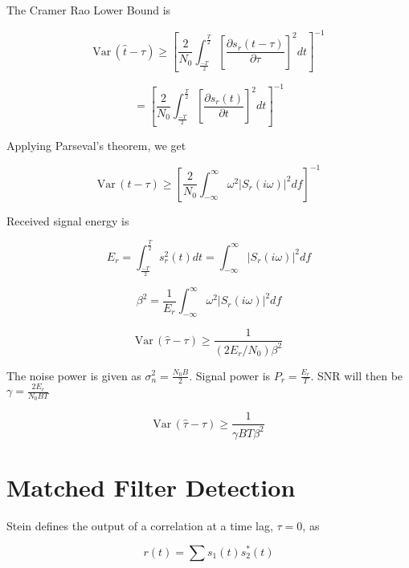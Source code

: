 \documentclass[11pt]{article}
\def\Var{{\textrm{Var}}\,}
\begin{document}
The Cramer Rao Lower Bound is

\begin{equation}
\Var(\hat{t} - \tau)
\geq
\left[
\frac{2}{N_0}
\int^\frac{T}{2}_\frac{-T}{2} \left[ \frac{\partial s_r(t-\tau)}{\partial \tau} \right]^2 dt \right]^{-1}
\end{equation}


\begin{equation}
= \left[ \frac{2}{N_0} \int^\frac{T}{2}_\frac{-T}{2} \left[ \frac{\partial s_r(t)}{\partial t} \right]^2 dt \right]^{-1}
\end{equation}

Applying Parseval's theorem, we get

\begin{equation}
\Var(t-\tau)
\geq
\left[ \frac{2}{N_0} \int^{\infty}_{-\infty} \omega^2 |S_r(i\omega )|^2 df \right]^{-1}
\end{equation}

Received signal energy is

\begin{equation}
E_r = \int^\frac{T}{2}_\frac{-T}{2} s_r^2(t)dt = \int^\infty_{-\infty} |S_r(i\omega)|^2 df
\end{equation}

\begin{equation}
\beta^2 = \frac{1}{E_r} \int^\infty_{-\infty} \omega^2 |S_r(i\omega)|^2 df
\end{equation}

\begin{equation}
\Var(\hat{\tau} - \tau)
\geq
\frac{1}{(2E_r/N_0)\beta^2}
\end{equation}

The noise power is given as $\sigma_n^2 = \frac{N_0B}{2}$. Signal power is $P_r = \frac{E_r}{T}$. SNR will then be $\gamma = \frac{2E_r}{N_0BT}$

\begin{equation}
\boxed{
\Var(\hat{\tau} - \tau)
\geq
\frac{1}{\gamma BT\beta^2}
}
\end{equation}


\section{Matched Filter Detection}

Stein defines the output of a correlation at a time lag, $\tau=0$, as

\begin{equation}
r(t) = \sum s_1(t)s^{*}_2(t)
\end{equation}
\end{document}
